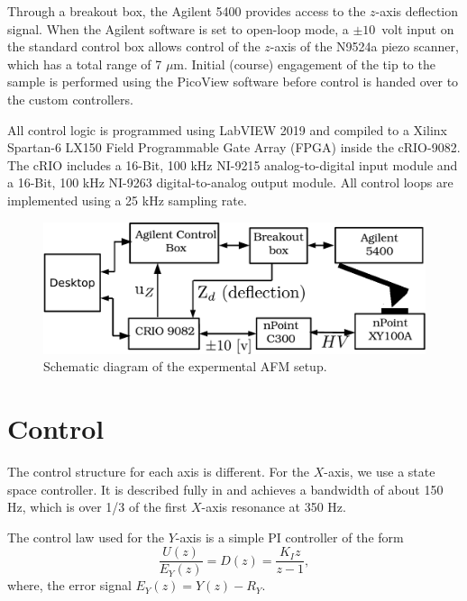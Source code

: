 \documentclass[twocolumn,oneside]{IEEEtran/IEEEtran}
\begin{document}
Through a breakout box, the Agilent 5400 provides access to the $z$-axis deflection signal. When the Agilent software is set to open-loop mode, a $\pm10$~volt input on the standard control box allows control of the $z$-axis of the N9524a piezo scanner, which has a total range of 7 $\mu$m.
Initial (course) engagement of the tip to the
sample is performed using the PicoView software before control is handed over to
the custom controllers.
	
All control logic is programmed using LabVIEW 2019 and compiled to a Xilinx
Spartan-6 LX150 Field Programmable Gate Array (FPGA) inside the cRIO-9082. The
cRIO includes a 16-Bit, 100 kHz NI-9215 analog-to-digital input module and a
16-Bit, 100 kHz NI-9263 digital-to-analog output module. All control loops are
implemented using a 25 kHz sampling rate.
\begin{figure}
  \includegraphics[width=1\columnwidth]{figures/exp_setup.pdf}
  \caption{Schematic diagram of the expermental AFM setup.}
  \label{fig:exp_setup}
\end{figure}
\section{Control}\label{sec:control}
The control structure for each axis is different. For the $X$-axis, we use a
state space controller. It is described fully in \cite{braker_afmmpc_2019} and
achieves a bandwidth of about 150 Hz, which is over 1/3 of the first $X$-axis
resonance at 350 Hz.

The control law used for the $Y$-axis is a simple PI controller of the
form
\begin{equation}
  \frac{U(z)}{E_Y(z)}=D(z) = \frac{K_Iz}{z-1},
  \label{eqn:dzI}
\end{equation}
where, the error signal $E_Y(z) = Y(z)-R_Y$.

\end{document}
